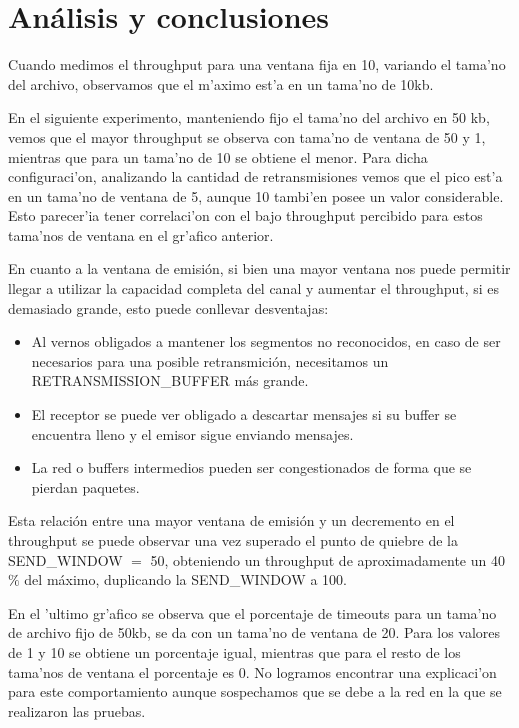 \section{Análisis y conclusiones}

Cuando medimos el throughput para una ventana fija en 10, variando el tama'no del archivo, observamos que el m'aximo est'a en un tama'no de 10kb. 
\newline

En el siguiente experimento, manteniendo fijo el tama'no del archivo en 50 kb, vemos que el mayor throughput se observa con tama'no de ventana de 50 y 1, mientras que para un tama'no de 10 se obtiene el menor. Para dicha configuraci'on, analizando la cantidad de retransmisiones vemos que el pico est'a en un tama'no de ventana de 5, aunque 10 tambi'en posee un valor considerable. Esto parecer'ia tener correlaci'on con el bajo throughput percibido para estos tama'nos de ventana en el gr'afico anterior.	
\newline

En cuanto a la ventana de emisión, si bien una mayor ventana nos puede permitir llegar a utilizar la capacidad completa del canal y aumentar el throughput, si es demasiado grande, esto puede conllevar desventajas: 
\begin{itemize}
\item	Al vernos obligados a mantener los segmentos no reconocidos, en caso de ser necesarios para una posible retransmición, necesitamos un RETRANSMISSION\_BUFFER más grande.
\item	El receptor se puede ver obligado a descartar mensajes si su buffer se encuentra lleno y el emisor sigue enviando mensajes.
\item	La red o buffers intermedios pueden ser congestionados de forma que se pierdan paquetes.
\end{itemize}

Esta relación entre una mayor ventana de emisión y un decremento en el throughput se puede observar una vez superado el punto de quiebre de la SEND\_WINDOW $=$ 50, obteniendo un throughput de aproximadamente un 40$\%$ del máximo, duplicando la SEND\_WINDOW a 100.
\newline

En el 'ultimo gr'afico se observa que el porcentaje de timeouts para un tama'no de archivo fijo de 50kb, se da con un tama'no de ventana de 20. Para los valores de 1 y 10 se obtiene un porcentaje igual, mientras que para el resto de los tama'nos de ventana el porcentaje es 0. No logramos encontrar una explicaci'on para este comportamiento aunque sospechamos que se debe a la red en la que se realizaron las pruebas. 

